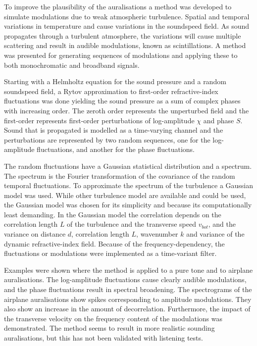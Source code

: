 To improve the plausibility of the auralisations
a method was developed to simulate modulations due to weak atmospheric
turbulence. Spatial and temporal variations in temperature and cause variations
in the soundspeed field. As sound propagates through a turbulent atmosphere, the
variations will cause multiple scattering and result in audible modulations,
known as scintillations. A method was presented for generating sequences of
modulations and applying these to both monochromatic and broadband signals.

Starting with a Helmholtz equation for the sound pressure and a random
soundspeed field, a Rytov approximation to first-order refractive-index
fluctuations was done yielding the sound pressure as a sum of complex phases
with increasing order. The zeroth order represents the unperturbed field and the
first-order represents first-order perturbations of log-amplitude $\chi$ and
phase $S$. Sound that is propagated is modelled as a time-varying channel and
the perturbations are represented by two random sequences, one for the
log-amplitude fluctuations, and another for the phase fluctuations.

The random fluctuations have a Gaussian statistical distribution and a spectrum.
The spectrum is the Fourier transformation of the covariance of the random
temporal fluctuations. To approximate the spectrum of the turbulence a Gaussian
model was used. While other turbulence model are available and could be used,
the Gaussian model was chosen for its simplicity and because its computationally
least demanding. In the Gaussian model the correlation depends on the
correlation length $L$ of the turbulence and the transverse speed $v_{bot}$, and
the variance on distance $d$, correlation length $L$, wavenumber $k$ and
variance of the dynamic refractive-index field. Because of the
frequency-dependency, the fluctuations or modulations were implemented as a
time-variant filter.

Examples were shown where the method is applied to a pure tone and to airplane
auralisations. The log-amplitude fluctuations cause clearly audible modulations,
and the phase fluctuations result in spectral broadening. The spectrograms of
the airplane auralisations show spikes corresponding to amplitude modulations.
They also show an increase in the amount of decorrelation. Furthermore, the
impact of the transverse velocity on the frequency content of the modulations
was demonstrated. The method seems to result in more realistic sounding
auralisations, but this has not been validated with listening tests.

